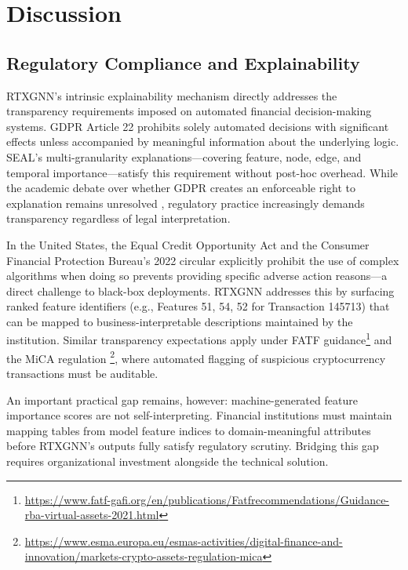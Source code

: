 \section{Discussion}
\label{sec:discussion}

\subsection{Regulatory Compliance and Explainability}
\label{subsec:regulatory_compliance}

RTXGNN's intrinsic explainability mechanism directly addresses the transparency requirements imposed on automated financial decision-making systems. GDPR Article 22 prohibits solely automated decisions with significant effects unless accompanied by meaningful information about the underlying logic. SEAL's multi-granularity explanations—covering feature, node, edge, and temporal importance—satisfy this requirement without post-hoc overhead. While the academic debate over whether GDPR creates an enforceable right to explanation remains unresolved \citep{wachter2017righttoexplanation, selbst2017meaningful, sargeant2026mind}, regulatory practice increasingly demands transparency regardless of legal interpretation.

In the United States, the Equal Credit Opportunity Act \citep{ecoa1974} and the Consumer Financial Protection Bureau's 2022 circular explicitly prohibit the use of complex algorithms when doing so prevents providing specific adverse action reasons—a direct challenge to black-box deployments. RTXGNN addresses this by surfacing ranked feature identifiers (e.g., Features 51, 54, 52 for Transaction 145713) that can be mapped to business-interpretable descriptions maintained by the institution. Similar transparency expectations apply under FATF guidance\footnote{\url{https://www.fatf-gafi.org/en/publications/Fatfrecommendations/Guidance-rba-virtual-assets-2021.html}} and the MiCA regulation \footnote{\url{https://www.esma.europa.eu/esmas-activities/digital-finance-and-innovation/markets-crypto-assets-regulation-mica}}, where automated flagging of suspicious cryptocurrency transactions must be auditable.

An important practical gap remains, however: machine-generated feature importance scores are not self-interpreting. Financial institutions must maintain mapping tables from model feature indices to domain-meaningful attributes before RTXGNN's outputs fully satisfy regulatory scrutiny. Bridging this gap requires organizational investment alongside the technical solution.

